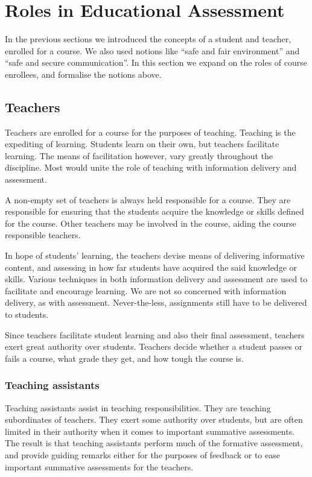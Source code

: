 
\section{Roles in Educational Assessment}

In the previous sections we introduced the concepts of a student and teacher,
enrolled for a course. We also used notions like ``safe and fair environment''
and ``safe and secure communication''. In this section we expand on the roles
of course enrollees, and formalise the notions above.

\subsection{Teachers}

Teachers are enrolled for a course for the purposes of teaching. Teaching is
the expediting of learning. Students learn on their own, but teachers
facilitate learning\cite{skinner-1965}. The means of facilitation however, vary
greatly throughout the discipline\cite{ramsden-1992,kember-1997}.  Most would
unite the role of teaching with information delivery and assessment.

A non-empty set of teachers is always held responsible for a course. They are
responsible for ensuring that the students acquire the knowledge or skills
defined for the course. Other teachers may be involved in the course, aiding
the course responsible teachers.

In hope of students' learning, the teachers devise means of delivering
informative content, and assessing in how far students have acquired the said
knowledge or skills. Various techniques in both information delivery and
assessment are used to facilitate and encourage learning. We are not so
concerned with information delivery, as with assessment. Never-the-less,
assignments still have to be delivered to students.

Since teachers facilitate student learning and also their final assessment,
teachers exert great authority over students. Teachers decide whether a student
passes or fails a course, what grade they get, and how tough the course is.

\subsubsection{Teaching assistants}

Teaching assistants assist in teaching responsibilities. They are teaching
subordinates of teachers. They exert some authority over students, but are
often limited in their authority when it comes to important summative
assessments. The result is that teaching assistants perform much of the
formative assessment, and provide guiding remarks either for the purposes of
feedback or to ease important summative assessments for the teachers.

